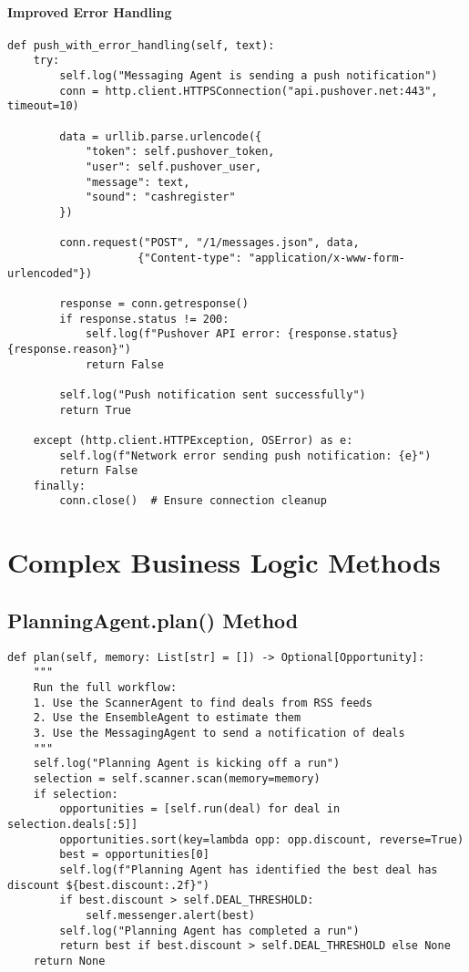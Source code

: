 \paragraph{Improved Error Handling}
\begin{lstlisting}[caption=Enhanced Error Handling Pattern]
def push_with_error_handling(self, text):
    try:
        self.log("Messaging Agent is sending a push notification")
        conn = http.client.HTTPSConnection("api.pushover.net:443", timeout=10)
        
        data = urllib.parse.urlencode({
            "token": self.pushover_token,
            "user": self.pushover_user,
            "message": text,
            "sound": "cashregister"
        })
        
        conn.request("POST", "/1/messages.json", data,
                    {"Content-type": "application/x-www-form-urlencoded"})
        
        response = conn.getresponse()
        if response.status != 200:
            self.log(f"Pushover API error: {response.status} {response.reason}")
            return False
            
        self.log("Push notification sent successfully")
        return True
        
    except (http.client.HTTPException, OSError) as e:
        self.log(f"Network error sending push notification: {e}")
        return False
    finally:
        conn.close()  # Ensure connection cleanup
\end{lstlisting}

\section{Complex Business Logic Methods}

\subsection{PlanningAgent.plan() Method}

\begin{lstlisting}[caption=Master Planning Method Analysis]
def plan(self, memory: List[str] = []) -> Optional[Opportunity]:
    """
    Run the full workflow:
    1. Use the ScannerAgent to find deals from RSS feeds
    2. Use the EnsembleAgent to estimate them
    3. Use the MessagingAgent to send a notification of deals
    """
    self.log("Planning Agent is kicking off a run")
    selection = self.scanner.scan(memory=memory)
    if selection:
        opportunities = [self.run(deal) for deal in selection.deals[:5]]
        opportunities.sort(key=lambda opp: opp.discount, reverse=True)
        best = opportunities[0]
        self.log(f"Planning Agent has identified the best deal has discount ${best.discount:.2f}")
        if best.discount > self.DEAL_THRESHOLD:
            self.messenger.alert(best)
        self.log("Planning Agent has completed a run")
        return best if best.discount > self.DEAL_THRESHOLD else None
    return None
\end{lstlisting}

